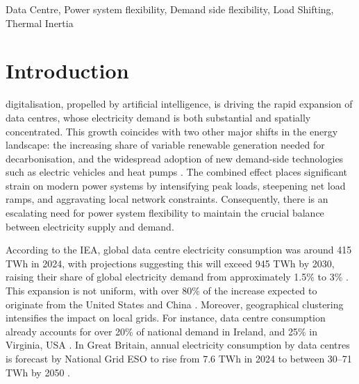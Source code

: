 \documentclass[lettersize,journal]{IEEEtran}
\begin{document}
\begin{IEEEkeywords}
Data Centre, Power system flexibility, Demand side flexibility, Load Shifting, Thermal Inertia
\end{IEEEkeywords}

\section{Introduction}

 digitalisation, propelled by artificial intelligence, is driving the rapid expansion of data centres, whose electricity demand is both substantial and spatially concentrated. This growth coincides with two other major shifts in the energy landscape: the increasing share of variable renewable generation needed for decarbonisation, and the widespread adoption of new demand-side technologies such as electric vehicles and heat pumps \cite{Centrica2020LEM, EEAACER2023Flex}. The combined effect places significant strain on modern power systems by intensifying peak loads, steepening net load ramps, and aggravating local network constraints. Consequently, there is an escalating need for power system flexibility to maintain the crucial balance between electricity supply and demand.

According to the IEA, global data centre electricity consumption was around 415 TWh in 2024, with projections suggesting this will exceed 945 TWh by 2030, raising their share of global electricity demand from approximately 1.5\% to 3\% \cite{iea_energy_ai}. This expansion is not uniform, with over 80\% of the increase expected to originate from the United States and China \cite{iea_energy_ai}. Moreover, geographical clustering intensifies the impact on local grids. For instance, data centre consumption already accounts for over 20\% of national demand in Ireland, and 25\% in Virginia, USA \cite{iea_energy_ai}. In Great Britain, annual electricity consumption by data centres is forecast by National Grid ESO to rise from 7.6 TWh in 2024 to between 30–71 TWh by 2050 \cite{neso2025future}.
\end{document}
